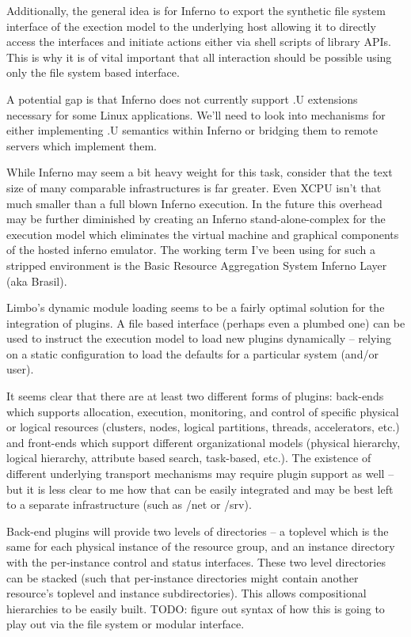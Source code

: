 \documentclass{sig-alternate}
\begin{document}
Additionally, the general idea is for Inferno to export the synthetic
file system interface of the exection model to the underlying host allowing
it to directly access the interfaces and initiate actions either via shell
scripts of library APIs.  This is why it is of vital important that all
interaction should be possible using only the file system based interface.

A potential gap is that Inferno does not currently support .U extensions
necessary for some Linux applications.  We'll need to look into mechanisms
for either implementing .U semantics within Inferno or bridging them to
remote servers which implement them.

While Inferno may seem a bit heavy weight for this task, consider that the
text size of many comparable infrastructures is far greater.  Even
XCPU isn't that much smaller than a full blown Inferno execution.  In the
future this overhead may be further diminished by creating an
Inferno stand-alone-complex for the execution model which eliminates the
virtual machine and graphical components of the hosted inferno emulator.
The working term I've been using for such a stripped environment is the
Basic Resource Aggregation System Inferno Layer (aka Brasil).

Limbo's dynamic module loading seems to be a fairly optimal solution for the
integration of plugins.  A file based interface (perhaps even a plumbed one)
can be used to instruct the execution model to load new plugins dynamically --
relying on a static configuration to load the defaults for a particular
system (and/or user).

It seems clear that there are at least two different forms of plugins: 
back-ends which supports allocation, execution, monitoring, and control of
specific physical or logical resources (clusters, nodes, logical partitions,
threads, accelerators, etc.) and front-ends which support different
organizational models (physical hierarchy, logical hierarchy, attribute
based search, task-based, etc.).  The existence of different underlying
transport mechanisms may require plugin support as well -- but it is less
clear to me how that can be easily integrated and may be best left to a
separate infrastructure (such as /net or /srv).

Back-end plugins will provide two levels of directories -- a toplevel which
is the same for each physical instance of the resource group, and an 
instance directory with the per-instance control and status interfaces.
These two level directories can be stacked (such that per-instance directories
might contain another resource's toplevel and instance subdirectories).  This
allows compositional hierarchies to be easily built.  TODO: figure out syntax 
of how this is going to play out via the file system or modular interface.
\end{document}
